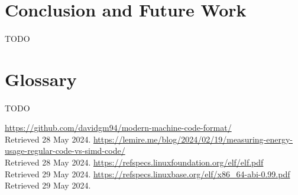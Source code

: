 \documentclass[12pt]{article}
\begin{document}
	\section{Conclusion and Future Work}
	\paragraph{}TODO
	
	\section{Glossary}
	\paragraph{}TODO

	\begin{thebibliography}{9}
		 \href{https://github.com/davidgm94/modern-machine-code-format/}{https://github.com/davidgm94/modern-machine-code-format/}\\
		Retrieved 28 May 2024.
		\href{https://lemire.me/blog/2024/02/19/measuring-energy-usage-regular-code-vs-simd-code}{https://lemire.me/blog/2024/02/19/measuring-energy-usage-regular-code-vs-simd-code/}\\
		Retrieved 28 May 2024.
		\href{https://refspecs.linuxfoundation.org/elf/elf.pdf}{https://refspecs.linuxfoundation.org/elf/elf.pdf}\\
		Retrieved 29 May 2024.
		\href{https://refspecs.linuxbase.org/elf/x86_64-abi-0.99.pdf}{https://refspecs.linuxbase.org/elf/x86\_64-abi-0.99.pdf}\\
		Retrieved 29 May 2024.
		
	\end{thebibliography}
\end{document}
